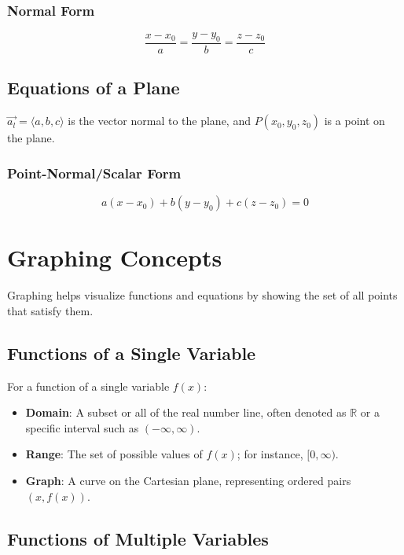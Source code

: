 \documentclass[a4paper,12pt,openany]{book}
\begin{document}
\subsubsection{Normal Form}
\begin{equation}
    \dfrac{x-x_0}{a} = \dfrac{y-y_0}{b} = \dfrac{z-z_0}{c}
\end{equation}

\subsection{Equations of a Plane}
\(\vec{a_l} = \langle a, b, c \rangle\) is the vector normal to the plane, and \(P(x_0, y_0, z_0)\) is a point on the plane.
\subsubsection{Point-Normal/Scalar Form}
\begin{equation}
    a(x-x_0) + b(y-y_0) + c(z-z_0) = 0
\end{equation}
\section{Graphing Concepts}

Graphing helps visualize functions and equations by showing the set of all points that satisfy them.

\subsection{Functions of a Single Variable}

For a function of a single variable \( f(x) \):
\begin{itemize}
    \item \textbf{Domain}: A subset or all of the real number line, often denoted as \(\mathbb{R}\) or a specific interval such as \((- \infty, \infty)\).
    \item \textbf{Range}: The set of possible values of \( f(x) \); for instance, \([0, \infty)\).
    \item \textbf{Graph}: A curve on the Cartesian plane, representing ordered pairs \((x, f(x))\).
\end{itemize}

\subsection{Functions of Multiple Variables}
\end{document}
